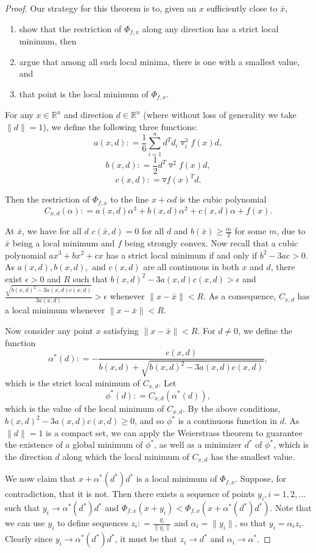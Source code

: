 \documentclass[11pt]{article}
\theoremstyle{plain}
\theoremstyle{definition}
\theoremstyle{remark}
\def \defeq{\mathrel{\mathop{:}}=}
\def \xbar{\bar{x}}
\def \grad{\triangledown}
\def \Hess{\triangledown^2}
\def \R{\mathbb{R}}
\def \Rn{\R^n}
\begin{document}
\begin{proof}
Our strategy for this theorem is to, given an $x$ sufficiently close to $\xbar$,
\begin{enumerate}
    \item show that the restriction of $\Phi_{f,x}$ along any direction has a strict local minimum, then
    \item argue that among all such local minima, there is one with a smallest value, and
    \item that point is the local minimum of $\Phi_{f,x}$.
\end{enumerate}
For any $x \in \Rn$ and direction $d \in \Rn$ (where without loss of generality we take $\|d\| = 1$), we define the following three functions:
$$a(x,d) \defeq \frac{1}{6}\sum_{i=1}^n d^T d_i \grad_i^3 f(x)d,$$
$$b(x,d) \defeq \frac{1}{2} d^T\Hess f(x)d,$$
$$c(x,d) \defeq \grad f(x)^Td.$$

Then the restriction of $\Phi_{f,x}$ to the line $x + \alpha d$ is the cubic polynomial
$$C_{x,d}(\alpha) \defeq a(x, d)\alpha^3 + b(x, d)\alpha^2 + c(x, d)\alpha + f(x).$$

At $\xbar$, we have for all $d$ $c(\xbar,d) = 0$ for all $d$ and $b(\xbar) \ge \frac{m}{2}$ for some $m$, due to $\xbar$ being a local minimum and $f$ being strongly convex. Now recall that a cubic polynomial $ax^3 + bx^2 + cx$ has a strict local minimum if and only if $b^2 - 3ac > 0$. As $a(x,d), b(x,d),$ and $c(x,d)$ are all continuous in both $x$ and $d$, there exist $\epsilon > 0$ and $R$ such that $b(x, d)^2 - 3a(x, d)c(x, d) > \epsilon$ and $\frac{\sqrt{b(x, d)^2 - 3a(x, d)c(x, d)}}{3a(x,d)} > \epsilon$ whenever $\|x - \xbar\| < R$. As a consequence, $C_{x,d}$ has a local minimum whenever $\|x - \xbar\| < R$.

Now consider any point $x$ satisfying $\|x - \xbar\| < R$. For $d \ne 0$, we define the function
$$\alpha^*(d) \defeq -\frac{c(x,d)}{b(x,d) + \sqrt{b(x,d)^2 - 3a(x,d)c(x,d)}},$$
which is the strict local minimum of $C_{x,d}$. Let
$$\phi^*(d) \defeq C_{x,d}(\alpha^*(d)),$$
which is the value of the local minimum of $C_{x,d}$. By the above conditions, $b(x,d)^2 - 3a(x,d)c(x,d) \ge 0$, and so $\phi^*$ is a continuous function in $d$. As $\|d\| = 1$ is a compact set, we can apply the Weierstrass theorem to guarantee the existence of a global minimum of $\phi^*$, as well as a minimizer $d^*$ of $\phi^*$, which is the direction $d$ along which the local minimum of $C_{x,d}$ has the smallest value.

We now claim that $x + \alpha^*(d^*)d^*$ is a local minimum of $\Phi_{f,x}$. Suppose, for contradiction, that it is not. Then there exists a sequence of points $y_i, i = 1, 2, \ldots$ such that $y_i \to \alpha^*(d^*) d^*$ and $\Phi_{f,x}(x+y_i) < \Phi_{f,x}(x+\alpha^*(d^*)d^*)$. Note that we can use $y_i$ to define sequences $z_i \defeq \frac{y_i}{\|y_i\|}$ and $\alpha_i = \|y_i\|$, so that $y_i = \alpha_iz_i$. Clearly since $y_i \to \alpha^*(d^*)d^*$, it must be that $z_i \to d^*$ and $\alpha_i \to \alpha^*$.


\end{proof}
\end{document}
